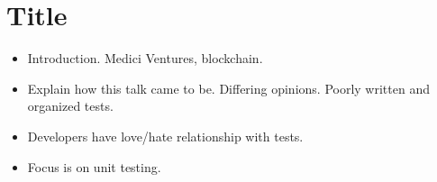 \documentclass{article}
\begin{document}
\sloppy
\section{Title}
\begin{itemize}
    \item Introduction. Medici Ventures, blockchain.
    \item Explain how this talk came to be. Differing opinions. Poorly written
        and organized tests.
    \item Developers have love/hate relationship with tests.
    \item Focus is on unit testing.
\end{itemize}
\end{document}
